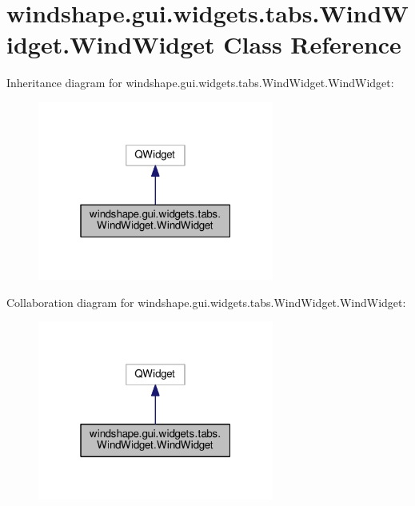 \hypertarget{classwindshape_1_1gui_1_1widgets_1_1tabs_1_1_wind_widget_1_1_wind_widget}{}\section{windshape.\+gui.\+widgets.\+tabs.\+Wind\+Widget.\+Wind\+Widget Class Reference}
\label{classwindshape_1_1gui_1_1widgets_1_1tabs_1_1_wind_widget_1_1_wind_widget}


Inheritance diagram for windshape.\+gui.\+widgets.\+tabs.\+Wind\+Widget.\+Wind\+Widget\+:\nopagebreak
\begin{figure}[H]
\begin{center}
\leavevmode
\includegraphics[width=220pt]{classwindshape_1_1gui_1_1widgets_1_1tabs_1_1_wind_widget_1_1_wind_widget__inherit__graph}
\end{center}
\end{figure}


Collaboration diagram for windshape.\+gui.\+widgets.\+tabs.\+Wind\+Widget.\+Wind\+Widget\+:\nopagebreak
\begin{figure}[H]
\begin{center}
\leavevmode
\includegraphics[width=220pt]{classwindshape_1_1gui_1_1widgets_1_1tabs_1_1_wind_widget_1_1_wind_widget__coll__graph}
\end{center}
\end{figure}

